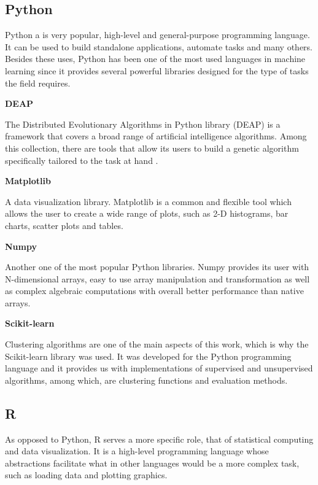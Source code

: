 \subsection{Python}

Python a is very popular, high-level and general-purpose programming language. It can be used to build standalone applications, automate tasks and many others. Besides these uses, Python has been one of the most used languages in machine learning since it provides several powerful libraries designed for the type of tasks the field requires.

\textbf{DEAP}

The Distributed Evolutionary Algorithms in Python library (DEAP) is a framework that covers a broad range of artificial intelligence algorithms. Among this collection, there are tools that allow its users to build a genetic algorithm specifically tailored to the task at hand \cite{DEAP_JMLR2012}.

\textbf{Matplotlib}

A data visualization library. Matplotlib is a common and flexible tool which allows the user to create a wide range of plots, such as 2-D histograms, bar charts, scatter plots and tables. \cite{Hunter2007}

\medskip
\textbf{Numpy}

Another one of the most popular Python libraries. Numpy provides its user with N-dimensional arrays, easy to use array manipulation and transformation as well as complex algebraic computations with overall better performance than native arrays. \cite{walt2011numpy}

\medskip
\textbf{Scikit-learn}

Clustering algorithms are one of the main aspects of this work, which is why the Scikit-learn \cite{scikitlearn} library was used. It was developed for the Python programming language and it provides us with implementations of supervised and unsupervised algorithms, among which, are clustering functions and evaluation methods.

\subsection{R}

As opposed to Python, R serves a more specific role, that of statistical computing and data visualization. It is a high-level programming language whose abstractions facilitate what in other languages would be a more complex task, such as loading data and plotting graphics.

